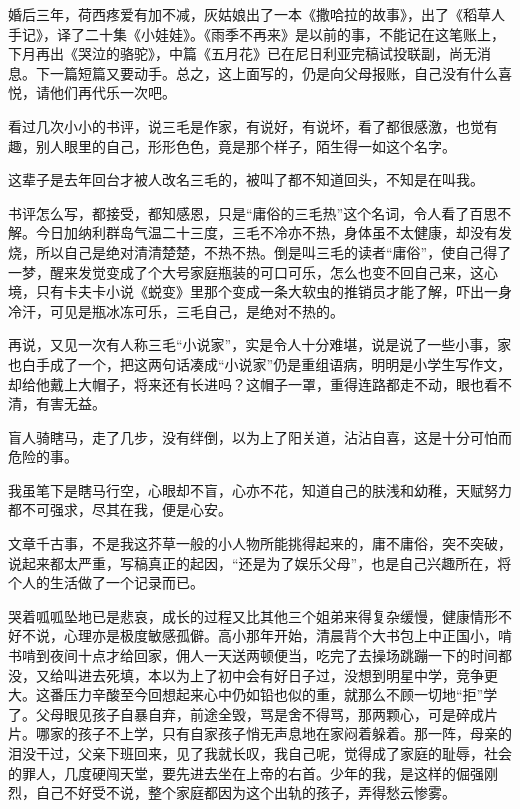 \par 婚后三年，荷西疼爱有加不减，灰姑娘出了一本《撒哈拉的故事》，出了《稻草人手记》，译了二十集《小娃娃》。《雨季不再来》是以前的事，不能记在这笔账上，下月再出《哭泣的骆驼》，中篇《五月花》已在尼日利亚完稿试投联副，尚无消息。下一篇短篇又要动手。总之，这上面写的，仍是向父母报账，自己没有什么喜悦，请他们再代乐一次吧。
\par 看过几次小小的书评，说三毛是作家，有说好，有说坏，看了都很感激，也觉有趣，别人眼里的自己，形形色色，竟是那个样子，陌生得一如这个名字。
\par 这辈子是去年回台才被人改名三毛的，被叫了都不知道回头，不知是在叫我。
\par 书评怎么写，都接受，都知感恩，只是“庸俗的三毛热”这个名词，令人看了百思不解。今日加纳利群岛气温二十三度，三毛不冷亦不热，身体虽不太健康，却没有发烧，所以自己是绝对清清楚楚，不热不热。倒是叫三毛的读者“庸俗”，使自己得了一梦，醒来发觉变成了个大号家庭瓶装的可口可乐，怎么也变不回自己来，这心境，只有卡夫卡小说《蜕变》里那个变成一条大软虫的推销员才能了解，吓出一身冷汗，可见是瓶冰冻可乐，三毛自己，是绝对不热的。
\par 再说，又见一次有人称三毛“小说家”，实是令人十分难堪，说是说了一些小事，家也白手成了一个，把这两句话凑成“小说家”仍是重组语病，明明是小学生写作文，却给他戴上大帽子，将来还有长进吗？这帽子一罩，重得连路都走不动，眼也看不清，有害无益。
\par 盲人骑瞎马，走了几步，没有绊倒，以为上了阳关道，沾沾自喜，这是十分可怕而危险的事。
\par 我虽笔下是瞎马行空，心眼却不盲，心亦不花，知道自己的肤浅和幼稚，天赋努力都不可强求，尽其在我，便是心安。
\par 文章千古事，不是我这芥草一般的小人物所能挑得起来的，庸不庸俗，突不突破，说起来都太严重，写稿真正的起因，“还是为了娱乐父母”，也是自己兴趣所在，将个人的生活做了一个记录而已。
\par 哭着呱呱坠地已是悲哀，成长的过程又比其他三个姐弟来得复杂缓慢，健康情形不好不说，心理亦是极度敏感孤僻。高小那年开始，清晨背个大书包上中正国小，啃书啃到夜间十点才给回家，佣人一天送两顿便当，吃完了去操场跳蹦一下的时间都没，又给叫进去死填，本以为上了初中会有好日子过，没想到明星中学，竞争更大。这番压力辛酸至今回想起来心中仍如铅也似的重，就那么不顾一切地“拒”学了。父母眼见孩子自暴自弃，前途全毁，骂是舍不得骂，那两颗心，可是碎成片片。哪家的孩子不上学，只有自家孩子悄无声息地在家闷着躲着。那一阵，母亲的泪没干过，父亲下班回来，见了我就长叹，我自己呢，觉得成了家庭的耻辱，社会的罪人，几度硬闯天堂，要先进去坐在上帝的右首。少年的我，是这样的倔强刚烈，自己不好受不说，整个家庭都因为这个出轨的孩子，弄得愁云惨雾。
